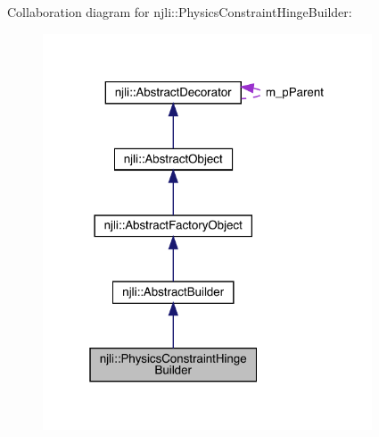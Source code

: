 Collaboration diagram for njli\+:\+:Physics\+Constraint\+Hinge\+Builder\+:\nopagebreak
\begin{figure}[H]
\begin{center}
\leavevmode
\includegraphics[width=277pt]{classnjli_1_1_physics_constraint_hinge_builder__coll__graph}
\end{center}
\end{figure}
